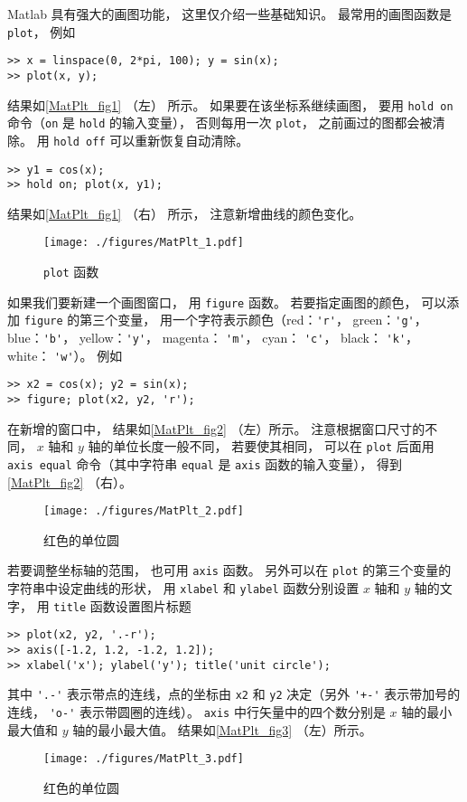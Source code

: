 

Matlab 具有强大的画图功能， 这里仅介绍一些基础知识。 最常用的画图函数是 \verb|plot|， 例如
\begin{lstlisting}[language=matlabC]
>> x = linspace(0, 2*pi, 100); y = sin(x);
>> plot(x, y);
\end{lstlisting}
结果如\autoref{MatPlt_fig1} （左） 所示。 如果要在该坐标系继续画图， 要用 \verb|hold on| 命令（\verb|on| 是 \verb|hold| 的输入变量）， 否则每用一次 \verb|plot|， 之前画过的图都会被清除。 用 \verb|hold off| 可以重新恢复自动清除。
\begin{lstlisting}[language=matlabC]
>> y1 = cos(x);
>> hold on; plot(x, y1);
\end{lstlisting}
结果如\autoref{MatPlt_fig1} （右） 所示， 注意新增曲线的颜色变化。
\begin{figure}[ht]
\centering
\texttt{[image: ./figures/MatPlt\_1.pdf]}
\caption{\lstinline|plot| 函数} \label{MatPlt_fig1}
\end{figure}

如果我们要新建一个画图窗口， 用 \verb|figure| 函数。 若要指定画图的颜色， 可以添加 \verb|figure| 的第三个变量， 用一个字符表示颜色（red：\verb|'r'|， green：\verb|'g'|， blue：\verb|'b'|， yellow：\verb|'y'|， magenta： \verb|'m'|， cyan： \verb|'c'|， black： \verb|'k'|， white： \verb|'w'|）。 例如
\begin{lstlisting}[language=matlabC]
>> x2 = cos(x); y2 = sin(x);
>> figure; plot(x2, y2, 'r');
\end{lstlisting}
在新增的窗口中， 结果如\autoref{MatPlt_fig2} （左）所示。 注意根据窗口尺寸的不同， $x$ 轴和 $y$ 轴的单位长度一般不同， 若要使其相同， 可以在 \verb|plot| 后面用 \verb|axis equal| 命令（其中字符串 \verb|equal| 是 \verb|axis| 函数的输入变量）， 得到\autoref{MatPlt_fig2} （右）。
\begin{figure}[ht]
\centering
\texttt{[image: ./figures/MatPlt\_2.pdf]}
\caption{红色的单位圆} \label{MatPlt_fig2}
\end{figure}
若要调整坐标轴的范围， 也可用 \verb|axis| 函数。 另外可以在 \verb|plot| 的第三个变量的字符串中设定曲线的形状， 用 \verb|xlabel| 和 \verb|ylabel| 函数分别设置 $x$ 轴和 $y$ 轴的文字， 用 \verb|title| 函数设置图片标题
\begin{lstlisting}[language=matlabC]
>> plot(x2, y2, '.-r');
>> axis([-1.2, 1.2, -1.2, 1.2]);
>> xlabel('x'); ylabel('y'); title('unit circle');
\end{lstlisting}
其中 \verb|'.-'| 表示带点的连线，点的坐标由 \verb|x2| 和 \verb|y2| 决定（另外 \verb|'+-'| 表示带加号的连线， \verb|'o-'| 表示带圆圈的连线）。 \verb|axis| 中行矢量中的四个数分别是 $x$ 轴的最小最大值和 $y$ 轴的最小最大值。 结果如\autoref{MatPlt_fig3} （左）所示。
\begin{figure}[ht]
\centering
\texttt{[image: ./figures/MatPlt\_3.pdf]}
\caption{红色的单位圆} \label{MatPlt_fig3}
\end{figure}


